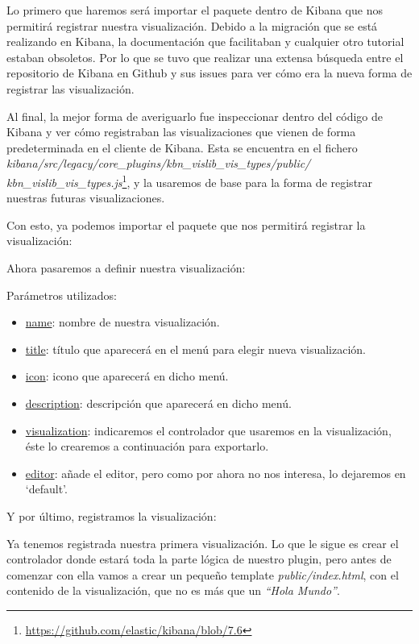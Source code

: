 \documentclass[a4paper, 12pt]{book}
\begin{document}
Lo primero que haremos será importar el paquete dentro de Kibana que nos permitirá registrar nuestra visualización. Debido a la migración que se está realizando en Kibana, la documentación que facilitaban y cualquier otro tutorial estaban obsoletos. Por lo que se tuvo que realizar una extensa búsqueda entre el repositorio de Kibana en Github y sus issues para ver cómo era la nueva forma de registrar las visualización. 

Al final, la mejor forma de averiguarlo fue inspeccionar dentro del código de Kibana y ver cómo registraban las visualizaciones que vienen de forma predeterminada en el cliente de Kibana. Esta se encuentra en el fichero \textit{kibana/src/legacy/core\_plugins/kbn\_vislib\_vis\_types/public/
kbn\_vislib\_vis\_types.js}\footnote{\url{https://github.com/elastic/kibana/blob/7.6}}, y la usaremos de base para la forma de registrar nuestras futuras visualizaciones.

Con esto, ya podemos importar el paquete que nos permitirá registrar la visualización:



Ahora pasaremos a definir nuestra visualización:


Parámetros utilizados:
\begin{itemize}
    \item \underline{name}: nombre de nuestra visualización.
    \item \underline{title}: título que aparecerá en el menú para elegir nueva visualización.
    \item \underline{icon}: icono que aparecerá en dicho menú.
    \item \underline{description}:  descripción que aparecerá en dicho menú.
    \item \underline{visualization}: indicaremos el controlador que usaremos en la visualización, éste lo crearemos a continuación para exportarlo.
    \item \underline{editor}: añade el editor, pero como por ahora no nos interesa, lo dejaremos en ‘default’.
\end{itemize}

Y por último, registramos la visualización:



Ya tenemos registrada nuestra primera visualización. Lo que le sigue es crear el controlador donde estará toda la parte lógica de nuestro plugin, pero antes de comenzar con ella vamos a crear un pequeño template \textit{public/index.html}, con el contenido de la visualización, que no es más que un \textit{“Hola Mundo”}.
\end{document}
